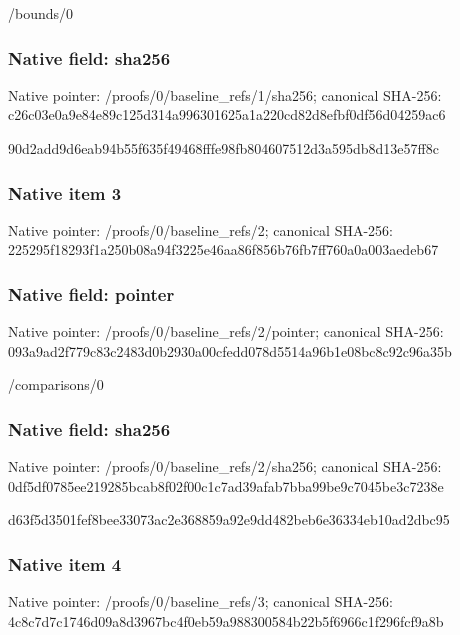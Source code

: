 \documentclass[10pt,a4paper]{article}
\begin{document}
\begingroup\raggedright\sloppy /\allowbreak{}bounds/\allowbreak{}0\par\endgroup

\subsubsection{Native field: sha256}
Native pointer: /proofs/0/baseline\_\allowbreak{}refs/1/sha256; canonical SHA-256: c26c03e0a9e84e89c125d314a996301625a1a220cd82d8efbf0df56d04259ac6

\begingroup\raggedright\sloppy 90d2add9d6eab94b55f635f49468fffe98fb804607512d3a595db8d13e57ff8c\par\endgroup

\subsubsection{Native item 3}
Native pointer: /proofs/0/baseline\_\allowbreak{}refs/2; canonical SHA-256: 225295f18293f1a250b08a94f3225e46aa86f856b76fb7ff760a0a003aedeb67

\subsubsection{Native field: pointer}
Native pointer: /proofs/0/baseline\_\allowbreak{}refs/2/pointer; canonical SHA-256: 093a9ad2f779c83c2483d0b2930a00cfedd078d5514a96b1e08bc8c92c96a35b

\begingroup\raggedright\sloppy /\allowbreak{}comparisons/\allowbreak{}0\par\endgroup

\subsubsection{Native field: sha256}
Native pointer: /proofs/0/baseline\_\allowbreak{}refs/2/sha256; canonical SHA-256: 0df5df0785ee219285bcab8f02f00c1c7ad39afab7bba99be9c7045be3c7238e

\begingroup\raggedright\sloppy d63f5d3501fef8bee33073ac2e368859a92e9dd482beb6e36334eb10ad2dbc95\par\endgroup

\subsubsection{Native item 4}
Native pointer: /proofs/0/baseline\_\allowbreak{}refs/3; canonical SHA-256: 4c8c7d7c1746d09a8d3967bc4f0eb59a988300584b22b5f6966c1f296fcf9a8b
\end{document}

